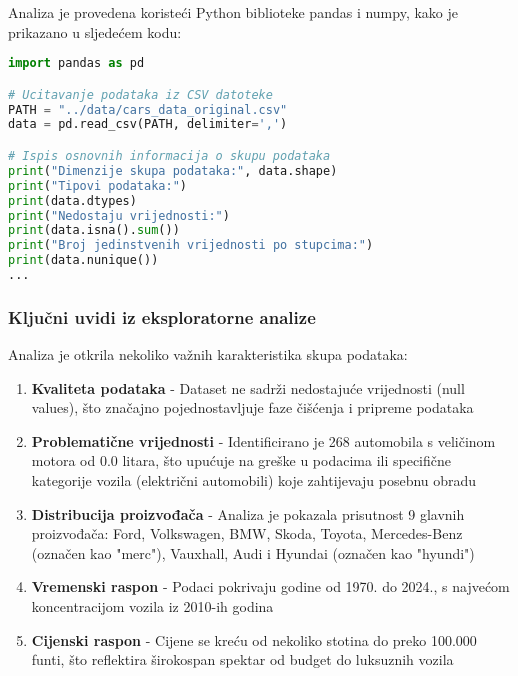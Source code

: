 Analiza je provedena koristeći Python biblioteke pandas i numpy, kako je prikazano u sljedećem kodu:

\begin{lstlisting}[language=Python, caption={Segment skripte za analizu - osnovni pregled strukture podataka}]
import pandas as pd

# Ucitavanje podataka iz CSV datoteke
PATH = "../data/cars_data_original.csv"
data = pd.read_csv(PATH, delimiter=',')

# Ispis osnovnih informacija o skupu podataka
print("Dimenzije skupa podataka:", data.shape)
print("Tipovi podataka:")
print(data.dtypes)
print("Nedostaju vrijednosti:")
print(data.isna().sum())
print("Broj jedinstvenih vrijednosti po stupcima:")
print(data.nunique())
...
\end{lstlisting}

\subsubsection{Ključni uvidi iz eksploratorne analize}

Analiza je otkrila nekoliko važnih karakteristika skupa podataka:

\begin{enumerate}
    \item \textbf{Kvaliteta podataka} - Dataset ne sadrži nedostajuće vrijednosti (null values), što značajno pojednostavljuje faze čišćenja i pripreme podataka

    \item \textbf{Problematične vrijednosti} - Identificirano je 268 automobila s veličinom motora od 0.0 litara, što upućuje na greške u podacima ili specifične kategorije vozila (električni automobili) koje zahtijevaju posebnu obradu

    \item \textbf{Distribucija proizvođača} - Analiza je pokazala prisutnost 9 glavnih proizvođača: Ford, Volkswagen, BMW, Skoda, Toyota, Mercedes-Benz (označen kao "merc"), Vauxhall, Audi i Hyundai (označen kao "hyundi")

    \item \textbf{Vremenski raspon} - Podaci pokrivaju godine od 1970. do 2024., s najvećom koncentracijom vozila iz 2010-ih godina

    \item \textbf{Cijenski raspon} - Cijene se kreću od nekoliko stotina do preko 100.000 funti, što reflektira širokospan spektar od budget do luksuznih vozila
\end{enumerate}

